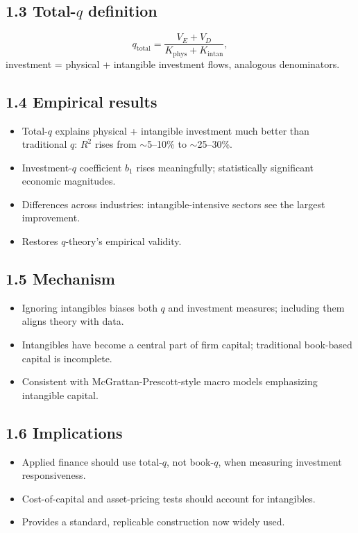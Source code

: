 \documentclass[11pt]{article}
\begin{document}
\subsection*{1.3 Total-$q$ definition}
\[
q_{\text{total}}=\frac{V_E+V_D}{K_{\text{phys}}+K_{\text{intan}}},
\]
investment = physical + intangible investment flows, analogous denominators.

\subsection*{1.4 Empirical results}
\begin{itemize}
\item Total-$q$ explains physical + intangible investment much better than traditional $q$: $R^2$ rises from $\sim$5--10\% to $\sim$25--30\%.
\item Investment-$q$ coefficient $b_1$ rises meaningfully; statistically significant economic magnitudes.
\item Differences across industries: intangible-intensive sectors see the largest improvement.
\item Restores $q$-theory's empirical validity.
\end{itemize}

\subsection*{1.5 Mechanism}
\begin{itemize}
\item Ignoring intangibles biases both $q$ and investment measures; including them aligns theory with data.
\item Intangibles have become a central part of firm capital; traditional book-based capital is incomplete.
\item Consistent with McGrattan-Prescott-style macro models emphasizing intangible capital.
\end{itemize}

\subsection*{1.6 Implications}
\begin{itemize}
\item Applied finance should use total-$q$, not book-$q$, when measuring investment responsiveness.
\item Cost-of-capital and asset-pricing tests should account for intangibles.
\item Provides a standard, replicable construction now widely used.
\end{itemize}
\end{document}

